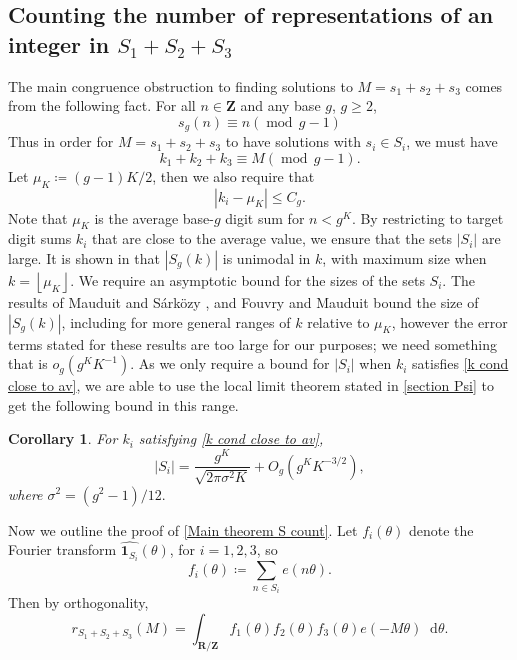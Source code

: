 \documentclass[hidelinks,11pt,reqno]{amsart}
\renewcommand{\leq}{\leqslant}
\renewcommand{\geq}{\geqslant}
\newcommand{\Z}{\ensuremath{\mathbf{Z}}}
\newcommand{\R}{\ensuremath{\mathbf{R}}}
\newcommand{\ind}{\mathbf{1}}
\newcommand*\dif{\mathop{}\!\mathrm{d}}
\newcommand{\floor}[1]{\left\lfloor #1 \right\rfloor}
\newcommand{\sd}[1]{s_{g}(#1)}
\newtheorem{cor}[prop]{Corollary}
\theoremstyle{remark}
\newcommand{\md}[1]{\ensuremath{(\operatorname{mod}\, #1)}}
\begin{document}
\subsection{Counting the number of representations of an integer in $S_{1}+S_{2}+S_{3}$}
The main congruence obstruction to finding solutions to $M=s_{1}+s_{2}+s_{3}$ comes from the following fact. For all $n\in \Z$ and any base $g$, $g\geq 2$,
\begin{equation}\label{cong fact}
    \sd{n}\equiv n\md{g-1}
\end{equation}
Thus in order for $M=s_{1}+s_{2}+s_{3}$ to have solutions with $s_{i}\in S_{i}$, we must have
\begin{equation}\label{k cond: congruences}
    k_{1}+k_{2}+k_{3}\equiv M \md{g-1}.
\end{equation}
Let $\mu_{K}\coloneq (g-1)K/2$, then we also require that
\begin{equation}\label{k cond close to av}
    |k_{i}-\mu_{K}|\leq C_{g}.
\end{equation}
Note that $\mu_{K}$ is the average base-$g$ digit sum for $n<g^{K}$. By restricting to target digit sums $k_{i}$ that are close to the average value, we ensure that the sets $|S_{i}|$ are large. It is shown in \citep[Lemma~3]{mauduit2005distribution} that $|S_{g}(k)|$ is unimodal in $k$, with maximum size when $k=\floor{\mu_{K}}$. We require an asymptotic bound for the sizes of the sets $S_{i}$. The results of Mauduit and S\'{a}rk\"{o}zy \citep[Theorem~1]{mauduit1997arithmetic}, and Fouvry and Mauduit \citep[Theorem~1.1]{fouvry2005entiers} bound the size of $|S_{g}(k)|$, including for more general ranges of $k$ relative to $\mu_{K}$, however the error terms stated for these results are too large for our purposes; we need something that is $o_{g}(g^{K}K^{-1})$. As we only require a bound for $|S_{i}|$ when $k_{i}$ satisfies \cref{k cond close to av}, we are able to use the local limit theorem stated in \cref{section Psi} to get the following bound in this range.
\begin{cor}\label{S set bound}
For $k_{i}$ satisfying \cref{k cond close to av},
    \[|S_{i}| =\frac{g^{K}}{\sqrt{2\pi \sigma^{2}K}}+O_{g}(g^{K}K^{-3/2}),\]
    where $\sigma^{2}=(g^{2}-1)/12.$
   \end{cor}
Now we outline the proof of \cref{Main theorem S count}. Let $f_{i}(\theta)$ denote the Fourier transform $\widehat{\ind_{S_{i}}}(\theta)$, for $i=1,2,3$, so
\[f_{i}(\theta)\coloneq \sum_{n\in S_{i}}e(n\theta).\]
Then by orthogonality,
\begin{equation}\label{main S count}
    r_{S_{1}+S_{2}+S_{3}}(M)=\int_{\R/\Z}f_{1}(\theta)f_{2}(\theta)f_{3}(\theta)e(-M\theta)\dif\theta.
\end{equation}
\end{document}
